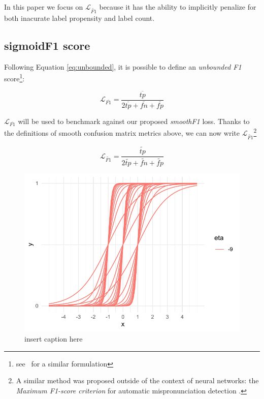 In this paper we focus on $\mathcal{L}_{\widetilde{\mathit{F1}}}$ because it has the ability to implicitly penalize for both inacurate label propensity and label count.


\subsection{sigmoidF1 score}
\label{sec:orgc5d29d7}

Following Equation \ref{eq:unbounded}, it is possible to define an \emph{unbounded F1} score\footnote{see~\cite{softF1} for a similar formulation}:

\begin{equation}
\mathcal{L}_{\overline{\mathit{F1}}}= \frac{\overline{tp}}{2 \overline{tp}+ \overline{fn}+ \overline{fp}}
\end{equation}

$\mathcal{L}_{\overline{\mathit{F1}}}$ will be used to benchmark against our proposed \emph{smoothF1} loss. Thanks to the definitions of smooth confusion matrix metrics above, we can now write $\mathcal{L}_{\widetilde{\mathit{F1}}}$\footnote{A similar method was proposed outside of the context of neural networks: the \emph{Maximum F1-score criterion} for automatic mispronunciation detection \cite{sigmoid}.}

\begin{equation}\label{eq:sigmoidF1}
\mathcal{L}_{\widetilde{\mathit{F1}}}= \frac{\widetilde{\mathit{tp}}}{2 \widetilde{\mathit{tp}}+ \widetilde{\mathit{fn}}+ \widetilde{\mathit{fp}}}
\end{equation}

\begin{figure}[htbp]
\centering
\includegraphics[width=.9\linewidth]{./images/sigmoid.pdf}
\caption{\label{fig:sigmoid}
insert caption here}
\end{figure}

